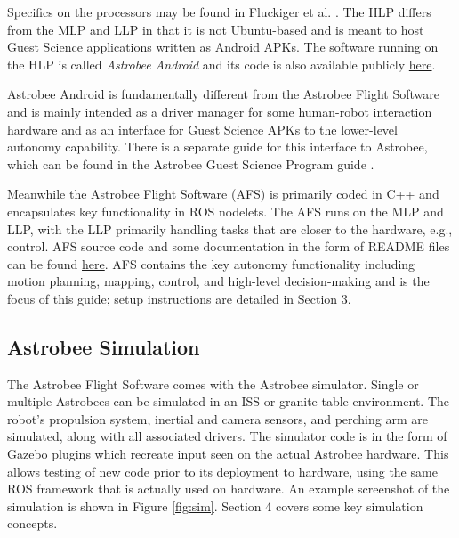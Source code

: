 \documentclass{article}
\begin{document}
Specifics on the processors may be found in Fluckiger et al. \cite{Fluckiger}. The HLP differs from the MLP and LLP in that it is not Ubuntu-based and is meant to host Guest Science applications written as Android APKs. The software running on the HLP is called \textit{Astrobee Android} and its code is also available publicly \href{https://github.com/nasa/astrobee\_android}{here}.

Astrobee Android is fundamentally different from the Astrobee Flight Software and is mainly intended as a driver manager for some human-robot interaction hardware and as an interface for Guest Science APKs to the lower-level autonomy capability. There is a separate guide for this interface to Astrobee, which can be found in the Astrobee Guest Science Program guide \cite{NASAAmesResearchCenter2017a}.

Meanwhile the Astrobee Flight Software (AFS) is primarily coded in C++ and encapsulates key functionality in ROS nodelets. The AFS runs on the MLP and LLP, with the LLP primarily handling tasks that are closer to the hardware, e.g., control. AFS source code and some documentation in the form of README files can be found \href{https://github.com/nasa/astrobee}{here}. AFS contains the key autonomy functionality including motion planning, mapping, control, and high-level decision-making and is the focus of this guide; setup instructions are detailed in Section 3.

\subsection{Astrobee Simulation}
The Astrobee Flight Software comes with the Astrobee simulator. Single or multiple Astrobees can be simulated in an ISS or granite table environment. The robot's propulsion system, inertial and camera sensors, and  perching arm are simulated, along with all associated drivers. The simulator code is in the form of Gazebo plugins which recreate input seen on the actual Astrobee hardware. This allows testing of new code prior to its deployment to hardware, using the same ROS framework that is actually used on hardware. An example screenshot of the simulation is shown in Figure \ref{fig:sim}. Section 4 covers some key simulation concepts.
\end{document}
